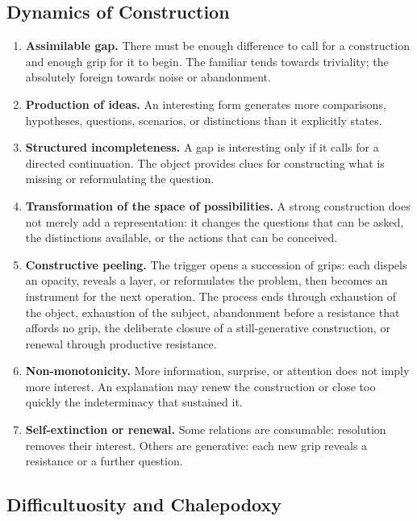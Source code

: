 \documentclass[11pt,a4paper]{article}
\begin{document}
\subsection{Dynamics of Construction}

\begin{enumerate}[resume]
  \item \textbf{Assimilable gap.} There must be enough difference to call for a
        construction and enough grip for it to begin. The familiar tends
        towards triviality; the absolutely foreign towards noise or
        abandonment.
  \item \textbf{Production of ideas.} An interesting form generates
        more comparisons, hypotheses, questions, scenarios, or distinctions
        than it explicitly states.
  \item \textbf{Structured incompleteness.} A gap is interesting only if it
        calls for a directed continuation. The object provides clues for
        constructing what is missing or reformulating the question.
  \item \textbf{Transformation of the space of possibilities.} A strong
        construction does not merely add a representation: it changes the
        questions that can be asked, the distinctions available, or the actions
        that can be conceived.
  \item \textbf{Constructive peeling.} The trigger opens a succession of
        grips: each dispels an opacity, reveals a layer, or reformulates the
        problem, then becomes an instrument for the next operation. The process
        ends through exhaustion of the object, exhaustion of the subject,
        abandonment before a resistance that affords no grip, the deliberate
        closure of a still-generative construction, or renewal through
        productive resistance.
  \item \textbf{Non-monotonicity.} More information, surprise, or attention does
        not imply more interest. An explanation may renew the construction or
        close too quickly the indeterminacy that sustained it.
  \item \textbf{Self-extinction or renewal.} Some relations are consumable:
        resolution removes their interest. Others are generative: each new grip
        reveals a resistance or a further question.
\end{enumerate}

\subsection{Difficultuosity and Chalepodoxy}
\end{document}
